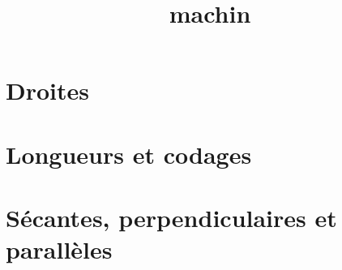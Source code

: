 \documentclass[12pt,a4paper]{article}
\date{}
\title{machin}
\begin{document}
%
%




\section{Droites}



\newpage

\section{Longueurs et codages}



\section{Sécantes, perpendiculaires et parallèles}


\end{document}

